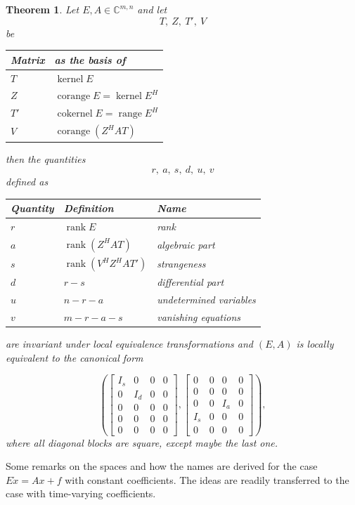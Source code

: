 \documentclass[]{book}
\newtheorem{theorem}{Theorem}[chapter]
\theoremstyle{definition}
\theoremstyle{definition}
\theoremstyle{definition}
\theoremstyle{definition}
\theoremstyle{remark}
\begin{document}
\begin{theorem}
\protect\hypertarget{thm:local-canonical-form}{}{\label{thm:local-canonical-form} }Let \(E, A \in \mathbb C^{m,n}\) and let
\begin{equation}
T,~Z,~T',~V \label{eq:lcf-subspaces}
\end{equation}
be

\begin{longtable}[]{@{}ll@{}}
\toprule
Matrix & as the basis of\tabularnewline
\midrule
\endhead
\(T\) & \(\operatorname{kernel}E\)\tabularnewline
\(Z\) & \(\operatorname{corange}E = \operatorname{kernel}E^H\)\tabularnewline
\(T'\) & \(\operatorname{cokernel}E = \operatorname{range}E^H\)\tabularnewline
\(V\) & \(\operatorname{corange}(Z^HAT)\)\tabularnewline
\bottomrule
\end{longtable}

then the quantities
\begin{equation}
r,~a,~s,~d,~u,~v \label{eq:lcf-quantities}
\end{equation}
defined as

\begin{longtable}[]{@{}lll@{}}
\toprule
Quantity & Definition & Name\tabularnewline
\midrule
\endhead
\(r\) & \(\operatorname{rank}E\) & \emph{rank}\tabularnewline
\(a\) & \(\operatorname{rank}(Z^HAT)\) & \emph{algebraic part}\tabularnewline
\(s\) & \(\operatorname{rank}(V^HZ^HAT')\) & \emph{strangeness}\tabularnewline
\(d\) & \(r-s\) & \emph{differential part}\tabularnewline
\(u\) & \(n-r-a\) & \emph{undetermined variables}\tabularnewline
\(v\) & \(m-r-a-s\) & \emph{vanishing equations}\tabularnewline
\bottomrule
\end{longtable}

are invariant under local equivalence transformations and \((E, A)\) is locally equivalent to the canonical form

\begin{equation}
\left(\begin{bmatrix}
I_s & 0 & 0 & 0 \\
0 & I_d & 0 & 0 \\
0 & 0 & 0 & 0 \\
0 & 0 & 0 & 0 \\
0 & 0 & 0 & 0
\end{bmatrix},
\begin{bmatrix}
0 & 0 & 0 & 0  \\
0 & 0 & 0 & 0  \\
0 & 0 & I_a & 0 \\
I_s & 0 & 0 & 0 \\
0 & 0 & 0 & 0
\end{bmatrix}\right),
\label{eq:local-canonical-form}
\end{equation}
where all diagonal blocks are square, except maybe the last one.
\end{theorem}
Some remarks on the spaces and how the names are derived for the case \(E\dot x = Ax +f\) with constant coefficients. The ideas are readily transferred to the case with time-varying coefficients.
\end{document}
